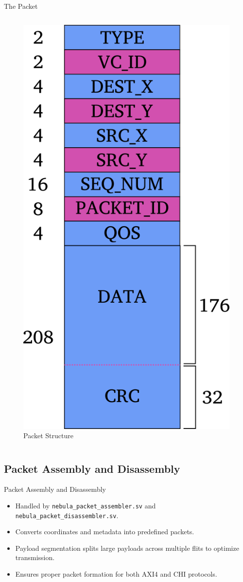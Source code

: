 \documentclass{beamer}
\begin{document}
\begin{frame}{The Packet}
\begin{columns}[T]
\begin{column}{0.3\textwidth}
\begin{figure}
				\includegraphics[width=0.8\linewidth]{images/packet-struct.png}
				\caption{Packet Structure}
			\end{figure}
		\end{column}
	\end{columns}
\end{frame}


\subsection{Packet Assembly and Disassembly}
\begin{frame}{Packet Assembly and Disassembly}
	\begin{itemize}
		\item Handled by \lstinline{nebula_packet_assembler.sv} and \lstinline{nebula_packet_disassembler.sv}.
\item Converts coordinates and metadata into predefined packets.
		\item Payload segmentation splits large payloads across multiple flits to optimize transmission.
		\item Ensures proper packet formation for both AXI4 and CHI protocols.
	\end{itemize}
\end{frame}
\end{document}
